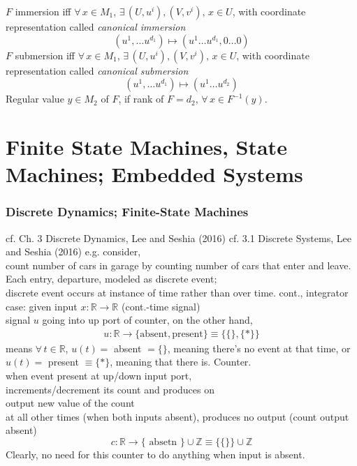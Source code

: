 \documentclass[10pt]{amsart}
\begin{document}
\begin{multicols*}{2}
$F$ immersion iff $\forall \, x \in M_1$, $\exists \, (U,u^i), (V,v^i), \, x\in U$, with coordinate representation called \emph{ canonical immersion } 
\[
(u^1, \dots u^{d_1}) \mapsto (u^1 \dots u^{d_1} , 0 \dots 0 )
\]
$F$ submersion iff $\forall \, x \in M_1$, $\exists \, (U,u^i), (V,v^i), \, x\in U$, with coordinate representation called \emph{ canonical submersion } 
\[
(u^1, \dots u^{d_1}) \mapsto (u^1 \dots u^{d_2}  )
\] 
Regular value $y \in M_2$ of $F$, if rank of $F = d_2$, $\forall \, x \in F^{-1}(y)$.  

\part{Finite State Machines, State Machines; Embedded Systems}  
\section{Discrete Dynamics; Finite-State Machines}  
cf. Ch. 3 Discrete Dynamics, Lee and Seshia (2016) \cite{LeSe2016}
cf. 3.1 Discrete Systems, Lee and Seshia (2016) \cite{LeSe2016}
e.g. consider,  \\
count number of cars in garage by counting number of cars that enter and leave.  
Each entry, departure, modeled as discrete event; \\
discrete event occurs at instance of time rather than over time.  
cont., integrator case: given input $x:\mathbb{R} \to \mathbb{R}$ (cont.-time signal) \\
signal $u$ going into up port of counter, on the other hand, 
\[
\begin{aligned}
u : \mathbb{R} \to \lbrace \text{absent}, \text{present}  \rbrace \equiv \lbrace \lbrace \rbrace, \lbrace * \rbrace \rbrace 
\end{aligned}
\]
means $\forall \, t\in \mathbb{R}$, $u(t) = $ absent $= \lbrace \rbrace$, meaning there's no event at that time, or \\
$u(t) = $ present $\equiv \lbrace * \rbrace$, meaning that there is.  
Counter.  \\
when event present at up/down input port, \\
increments/decrement its count and produces on \\
output new value of the count \\
at all other times (when both inputs absent), produces no output (count output absent)
\[
c:\mathbb{R} \to \lbrace \text{ absetn } \rbrace \cup \mathbb{Z} \equiv \lbrace \lbrace \rbrace \rbrace \cup \mathbb{Z}
\]
Clearly, no need for this counter to do anything when input is absent.  

\end{multicols*}
\end{document}
